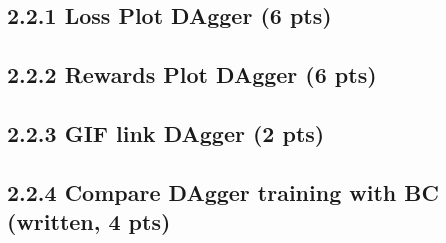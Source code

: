 \documentclass[12pt]{article}
\begin{document}
\subsection*{2.2.1 Loss Plot DAgger (6 pts)}
\begin{tcolorbox}[fit,height=20em, width=40em, blank, borderline={1pt}{1pt},nobeforeafter]
            \begin{center}
            \begin{solution}                    
            
                        \end{solution}
            \end{center}
            \end{tcolorbox}
           
            
\subsection*{2.2.2 Rewards Plot DAgger (6 pts)}

\begin{tcolorbox}[fit,height=24em, width=40em, blank, borderline={1pt}{1pt},nobeforeafter]
            \begin{center}
            \begin{solution}

            \end{solution}
\end{center}
\end{tcolorbox}

\subsection*{2.2.3 GIF link DAgger (2 pts)}

\begin{tcolorbox}[fit,height=5em, width=40em, blank, borderline={1pt}{1pt},nobeforeafter]
            \begin{solution}
            \end{solution}

\end{tcolorbox}

\subsection*{2.2.4 Compare DAgger training with BC (written, 4 pts)}
\begin{tcolorbox}[fit,height=10em, width=40em, blank, borderline={1pt}{1pt},nobeforeafter]
            \begin{center}
            \begin{solution}

            \end{solution}
            \end{center}
            \end{tcolorbox}
\end{document}
